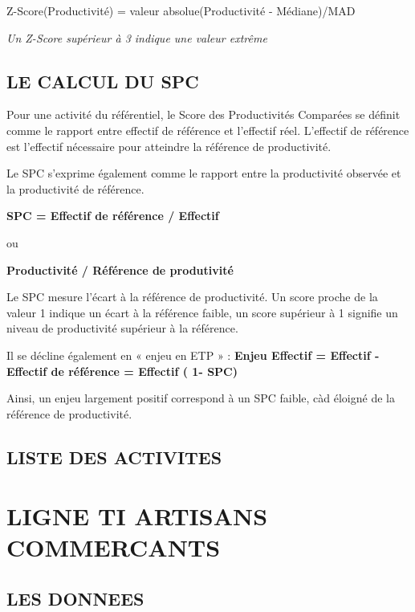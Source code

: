 \documentclass[
]{book}
\begin{document}
Z-Score(Productivité) = valeur absolue(Productivité - Médiane)/MAD

\emph{Un Z-Score supérieur à 3 indique une valeur extrême}

\hypertarget{le-calcul-du-spc-3}{%
\section{LE CALCUL DU SPC}\label{le-calcul-du-spc-3}}

Pour une activité du référentiel, le Score des Productivités Comparées se définit comme le rapport entre effectif de référence et l'effectif réel. L'effectif de référence est l'effectif nécessaire pour atteindre la référence de productivité.

Le SPC s'exprime également comme le rapport entre la productivité observée et la productivité de référence.

\textbf{SPC = Effectif de référence / Effectif}

ou

\textbf{Productivité / Référence de produtivité}

Le SPC mesure l'écart à la référence de productivité. Un score proche de la valeur 1 indique un écart à la référence faible, un score supérieur à 1 signifie un niveau de productivité supérieur à la référence.

Il se décline également en « enjeu en ETP » :
\textbf{Enjeu Effectif = Effectif - Effectif de référence = Effectif ( 1- SPC)}

Ainsi, un enjeu largement positif correspond à un SPC faible, càd éloigné de la référence de productivité.

\hypertarget{liste-des-activites}{%
\section{LISTE DES ACTIVITES}\label{liste-des-activites}}

\hypertarget{ligne-ti-artisans-commercants}{%
\chapter{LIGNE TI ARTISANS COMMERCANTS}\label{ligne-ti-artisans-commercants}}

\hypertarget{les-donnees-7}{%
\section{LES DONNEES}\label{les-donnees-7}}
\end{document}
